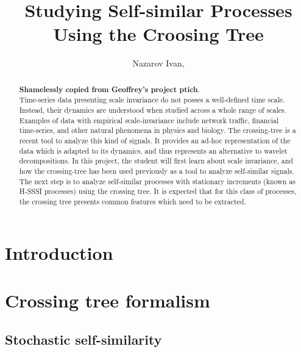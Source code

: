 \documentclass[a4paper]{report}
\title{Studying Self-similar Processes Using the Croosing Tree}
\author{Nazarov Ivan, \rus{101мНОД(ИССА)}}
\begin{document}

\clearpage


\clearpage

\maketitle
\begin{abstract}
\textbf{Shamelessly copied from Geoffrey's project ptich}.\hfill \\
Time-series data presenting scale invariance do not posses a well-defined time scale.
Instead, their dynamics are understood when studied across a whole range of scales.
Examples of data with empirical scale-invariance include network traffic, financial
time-series, and other natural phenomena in physics and biology. The crossing-tree
is a recent tool to analyze this kind of signals. It provides an ad-hoc representation
of the data which is adapted to its dynamics, and thus represents an alternative to
wavelet decompositions. In this project, the student will first learn about scale
invariance, and how the crossing-tree has been used previously as a tool to analyze
self-similar signals. The next step is to analyze self-similar processes with stationary
increments (known as H-SSSI processes) using the crossing tree. It is expected that
for this class of processes, the crossing tree presents common features which need
to be extracted.
\end{abstract}

\tableofcontents
\clearpage
{}


\chapter*{Introduction} %
\label{cha:introduction}


\chapter{Crossing tree formalism} %
\label{cha:crossing_tree_formalism}

\section{Stochastic self-similarity} %
\label{sec:stochastic_self_similarity}
\end{document}
